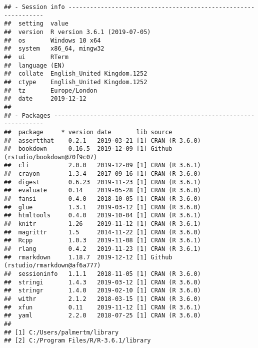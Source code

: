 \documentclass[
  10pt,
]{book}
\begin{document}
\begin{verbatim}
## - Session info ---------------------------------------------------------------
##  setting  value                       
##  version  R version 3.6.1 (2019-07-05)
##  os       Windows 10 x64              
##  system   x86_64, mingw32             
##  ui       RTerm                       
##  language (EN)                        
##  collate  English_United Kingdom.1252 
##  ctype    English_United Kingdom.1252 
##  tz       Europe/London               
##  date     2019-12-12                  
## 
## - Packages -------------------------------------------------------------------
##  package     * version date       lib source                            
##  assertthat    0.2.1   2019-03-21 [1] CRAN (R 3.6.0)                    
##  bookdown      0.16.5  2019-12-09 [1] Github (rstudio/bookdown@70f9c07) 
##  cli           2.0.0   2019-12-09 [1] CRAN (R 3.6.1)                    
##  crayon        1.3.4   2017-09-16 [1] CRAN (R 3.6.0)                    
##  digest        0.6.23  2019-11-23 [1] CRAN (R 3.6.1)                    
##  evaluate      0.14    2019-05-28 [1] CRAN (R 3.6.0)                    
##  fansi         0.4.0   2018-10-05 [1] CRAN (R 3.6.0)                    
##  glue          1.3.1   2019-03-12 [1] CRAN (R 3.6.0)                    
##  htmltools     0.4.0   2019-10-04 [1] CRAN (R 3.6.1)                    
##  knitr         1.26    2019-11-12 [1] CRAN (R 3.6.1)                    
##  magrittr      1.5     2014-11-22 [1] CRAN (R 3.6.0)                    
##  Rcpp          1.0.3   2019-11-08 [1] CRAN (R 3.6.1)                    
##  rlang         0.4.2   2019-11-23 [1] CRAN (R 3.6.1)                    
##  rmarkdown     1.18.7  2019-12-12 [1] Github (rstudio/rmarkdown@af6a777)
##  sessioninfo   1.1.1   2018-11-05 [1] CRAN (R 3.6.0)                    
##  stringi       1.4.3   2019-03-12 [1] CRAN (R 3.6.0)                    
##  stringr       1.4.0   2019-02-10 [1] CRAN (R 3.6.0)                    
##  withr         2.1.2   2018-03-15 [1] CRAN (R 3.6.0)                    
##  xfun          0.11    2019-11-12 [1] CRAN (R 3.6.1)                    
##  yaml          2.2.0   2018-07-25 [1] CRAN (R 3.6.0)                    
## 
## [1] C:/Users/palmertm/library
## [2] C:/Program Files/R/R-3.6.1/library
\end{verbatim}

  

\backmatter
\end{document}
